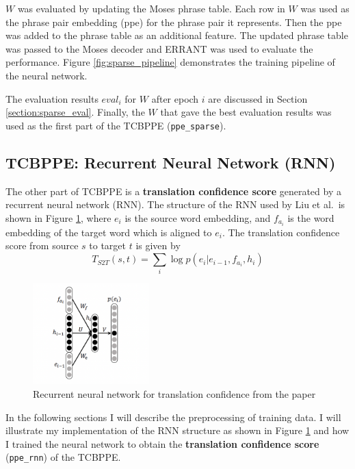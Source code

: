 \documentclass[12pt,a4paper,twoside]{report}
\begin{document}
$W$ was evaluated by updating the Moses phrase table. Each row in $W$ was used as the phrase pair embedding (ppe) for the phrase pair it represents. Then the ppe was added to the phrase table as an additional feature. The updated phrase table was passed to the Moses decoder and ERRANT was used to evaluate the performance. Figure \ref{fig:sparse_pipeline} demonstrates the training pipeline of the neural network.

The evaluation results $eval_i$ for $W$ after epoch $i$ are discussed in Section \ref{section:sparse_eval}. Finally, the $W$ that gave the best evaluation results was used as the first part of the TCBPPE (\texttt{ppe\_sparse}).

\subsection{TCBPPE: Recurrent Neural Network (RNN)} \label{section:TCBPPE_rnn}

The other part of TCBPPE is a \textbf{translation confidence score} generated by a recurrent neural network (RNN). The structure of the RNN used by Liu et al.~is shown in Figure \ref{fig:rnn_ppe}, where $e_i$ is the source word embedding, and $f_{a_i}$ is the word embedding of the target word which is aligned to $e_i$. The translation confidence score from source $s$ to target $t$ is given by
\[ T_{S2T}(s, t) = \sum_{i} \log p(e_i|e_{i-1}, f_{a_i}, h_i)\]

\begin{figure}[ht]
\centering
\includegraphics[width=0.4\textwidth]{images/rnn_ppe.png}
\caption{Recurrent neural network for translation confidence from the paper~\cite{r2nn}}
\label{fig:rnn_ppe}
\end{figure}

In the following sections I will describe the preprocessing of training data. I will illustrate my implementation of the RNN structure as shown in Figure \ref{fig:rnn_ppe} and how I trained the neural network to obtain the \textbf{translation confidence score} (\texttt{ppe\_rnn}) of the TCBPPE.
\end{document}
